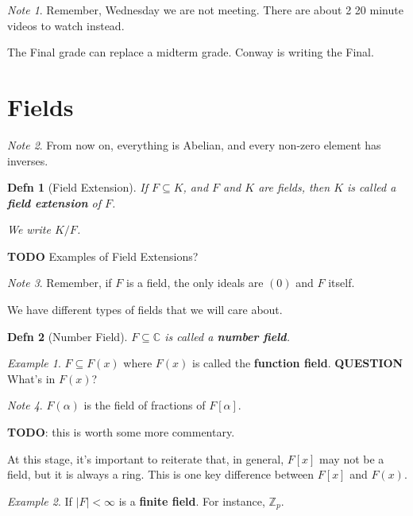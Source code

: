 \documentclass[12pt]{article}
\def\Z{{\mathbb Z}}
\def\C{{\mathbb C}}
\def\TODO{\color{red}\textbf{TODO}\color{black}}
\def\QUESTION{\color{red}\textbf{QUESTION}\color{black}\,}
\newtheorem{definition}{Defn}
\theoremstyle{remark}
\theoremstyle{remark}
\theoremstyle{remark}
\newtheorem{example}{Example}
\theoremstyle{remark}
\theoremstyle{remark}
\newtheorem*{note}{Note}
\begin{document}
\begin{note}
  Remember, Wednesday we are not meeting. There are about 2 20 minute videos to
  watch instead.

  The Final grade can replace a midterm grade. Conway is writing the Final.
\end{note}

\section{Fields}

\begin{note}
  From now on, everything is Abelian, and every non-zero element has inverses.
\end{note}

\begin{definition}[Field Extension]
  If $F \subseteq K$, and $F$ and $K$ are fields, then $K$ is called a {\bf
  field extension} of $F$.

  We write $K / F$.
\end{definition}

\TODO{} Examples of Field Extensions?

\begin{note}
  Remember, if $F$ is a field, the only ideals are $(0)$ and $F$ itself.
\end{note}

We have different types of fields that we will care about.

\begin{definition}[Number Field]
  $F \subseteq \C$ is called a {\bf number field}.
\end{definition}

\begin{example}
  $F \subseteq F(x)$ where $F(x)$ is called the {\bf function field}.
  \QUESTION What's in $F(x)$?
\end{example}

\begin{note}
  $F(\alpha)$ is the field of fractions of $F[\alpha]$.
  
  \TODO: this is worth some more commentary.
\end{note}

At this stage, it's important to reiterate that, in general, $F[x]$ may not be
a field, but it is always a ring. This is one key difference between $F[x]$ and
$F(x)$.

\begin{example}
  If $|F| < \infty$ is a {\bf finite field}. For instance, $\Z_p$.
\end{example}
\end{document}

